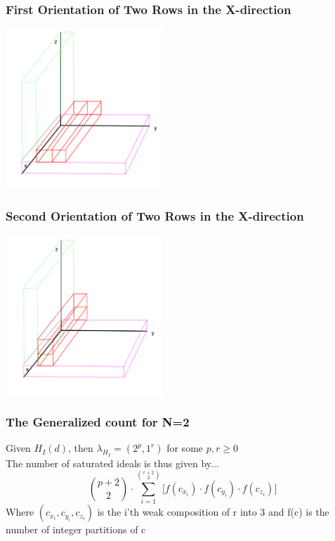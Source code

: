 \documentclass{beamer}
\begin{document}
\begin{frame}
	\frametitle{First Orientation of Two Rows in the X-direction}
	\begin{center}
	\includegraphics[width = 6cm, height = 6cm]{LogMMidtermPresentationImages/2rowsfirstorientation3space.png}
	\end{center}
\end{frame}

\begin{frame}
	\frametitle{Second Orientation of Two Rows in the X-direction}
	\begin{center}
	\includegraphics[width = 6cm, height = 6cm]{LogMMidtermPresentationImages/2rowssecondorientation3space.png}
	\end{center}
\end{frame}

\begin{frame}
	\frametitle{The Generalized count for N=2}
	Given $H_I(d)$, then $\lambda_{H_I} = (2^{p}, 1^{r})$ for some $p,r \geq 0$\\
	The number of saturated ideals is thus given by...
	\[\binom{p+2}{2}\cdot \sum_{i=1}^{\binom{r+2}{2}}\Big[f(c_{x_i})\cdot f(c_{y_i})\cdot f(c_{z_i})\Big]
	\]
	Where $(c_{x_i},c_{y_i}, c_{z_i})$ is the i'th weak composition of r into 3 and f(c) is the number of integer partitions of c
\end{frame}
\end{document}
